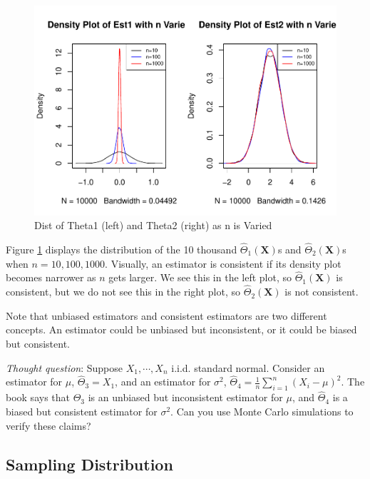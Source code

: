 \documentclass[
]{book}
\begin{document}
\begin{figure}
\centering
\includegraphics{bookdown-demo_files/figure-latex/7-consistent-1.pdf}
\caption{\label{fig:7-consistent}Dist of Theta1 (left) and Theta2 (right) as n is Varied}
\end{figure}

Figure \ref{fig:7-consistent} displays the distribution of the 10 thousand \(\hat{\Theta}_1(\boldsymbol{X})\)s and \(\hat{\Theta}_2(\boldsymbol{X})\)s when \(n=10, 100, 1000\). Visually, an estimator is consistent if its density plot becomes narrower as \(n\) gets larger. We see this in the left plot, so \(\hat{\Theta}_1(\boldsymbol{X})\) is consistent, but we do not see this in the right plot, so \(\hat{\Theta}_2(\boldsymbol{X})\) is not consistent.

Note that unbiased estimators and consistent estimators are two different concepts. An estimator could be unbiased but inconsistent, or it could be biased but consistent.

\emph{Thought question}: Suppose \(X_1, \cdots, X_n\) i.i.d. standard normal. Consider an estimator for \(\mu\), \(\hat{\Theta}_3 = X_1\), and an estimator for \(\sigma^2\), \(\hat{\Theta}_4 = \frac{1}{n} \sum_{i=1}^n (X_i - \mu)^2\). The book says that \(\hat{\Theta}_3\) is an unbiased but inconsistent estimator for \(\mu\), and \(\hat{\Theta}_4\) is a biased but consistent estimator for \(\sigma^2\). Can you use Monte Carlo simulations to verify these claims?

\hypertarget{sampling-distribution}{%
\subsection{Sampling Distribution}\label{sampling-distribution}}
\end{document}
